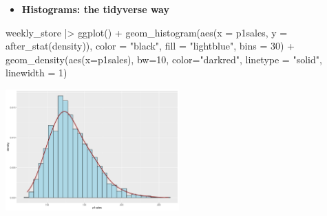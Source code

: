 \documentclass[
  ignorenonframetext,
]{beamer}
\newenvironment{Shaded}{\begin{snugshade}}{\end{snugshade}}
\newcommand{\AttributeTok}[1]{\textcolor[rgb]{0.40,0.45,0.13}{#1}}
\newcommand{\DecValTok}[1]{\textcolor[rgb]{0.68,0.00,0.00}{#1}}
\newcommand{\FunctionTok}[1]{\textcolor[rgb]{0.28,0.35,0.67}{#1}}
\newcommand{\NormalTok}[1]{\textcolor[rgb]{0.00,0.23,0.31}{#1}}
\newcommand{\SpecialCharTok}[1]{\textcolor[rgb]{0.37,0.37,0.37}{#1}}
\newcommand{\StringTok}[1]{\textcolor[rgb]{0.13,0.47,0.30}{#1}}
\providecommand{\tightlist}{%
  \setlength{\itemsep}{0pt}\setlength{\parskip}{0pt}}\usepackage{longtable,booktabs,array}
\begin{document}
\begin{frame}[fragile]{}
\label{section-19}
\begin{itemize}
\tightlist
\item
  \textbf{Histograms: the tidyverse way}
\end{itemize}

\tiny

\begin{Shaded}
\begin{Highlighting}[]
\NormalTok{weekly\_store }\SpecialCharTok{|\textgreater{}} \FunctionTok{ggplot}\NormalTok{() }\SpecialCharTok{+} 
  \FunctionTok{geom\_histogram}\NormalTok{(}\FunctionTok{aes}\NormalTok{(}\AttributeTok{x =}\NormalTok{ p1sales, }\AttributeTok{y =} \FunctionTok{after\_stat}\NormalTok{(density)),}
                 \AttributeTok{color =} \StringTok{"black"}\NormalTok{, }\AttributeTok{fill =} \StringTok{"lightblue"}\NormalTok{, }\AttributeTok{bins =} \DecValTok{30}\NormalTok{) }\SpecialCharTok{+}
  \FunctionTok{geom\_density}\NormalTok{(}\FunctionTok{aes}\NormalTok{(}\AttributeTok{x=}\NormalTok{p1sales),}
               \AttributeTok{bw=}\DecValTok{10}\NormalTok{, }\AttributeTok{color=}\StringTok{"darkred"}\NormalTok{,}
               \AttributeTok{linetype =} \StringTok{"solid"}\NormalTok{, }\AttributeTok{linewidth =} \DecValTok{1}\NormalTok{)}
\end{Highlighting}
\end{Shaded}

\begin{center}
\includegraphics[width=0.5\textwidth,height=\textheight]{003_describing_data_files/figure-beamer/unnamed-chunk-18-1.pdf}
\end{center}
\end{frame}
\end{document}

